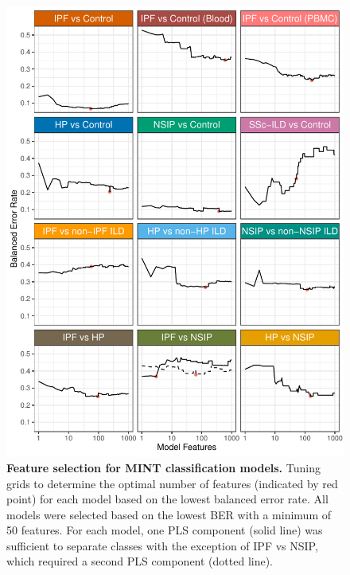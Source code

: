 \documentclass[
]{article}
\begin{document}
\begin{figure}

{\centering \includegraphics[width=1\linewidth,]{./Figures/SysReview/FigE2_tuning} 

}

\caption[Model tuning]{\textbf{Feature selection for MINT classification models.} Tuning grids to determine the optimal number of features (indicated by red point) for each model based on the lowest balanced error rate. All models were selected based on the lowest BER with a minimum of 50 features. For each model, one PLS component (solid line) was sufficient to separate classes with the exception of IPF vs NSIP, which required a second PLS component (dotted line).}\label{fig:tuningMINT}
\end{figure}
\end{document}
